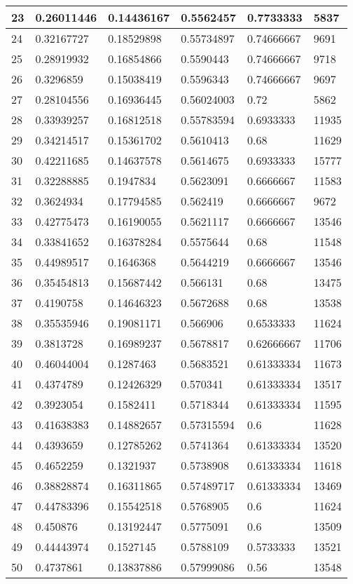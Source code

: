 \begin{longtable}{|l|l|l|l|l|l|}
23 & 0.26011446 & 0.14436167 & 0.5562457 & 0.7733333 & 5837 \\ \hline 
24 & 0.32167727 & 0.18529898 & 0.55734897 & 0.74666667 & 9691 \\ \hline 
25 & 0.28919932 & 0.16854866 & 0.5590443 & 0.74666667 & 9718 \\ \hline 
26 & 0.3296859 & 0.15038419 & 0.5596343 & 0.74666667 & 9697 \\ \hline 
27 & 0.28104556 & 0.16936445 & 0.56024003 & 0.72 & 5862 \\ \hline 
28 & 0.33939257 & 0.16812518 & 0.55783594 & 0.6933333 & 11935 \\ \hline 
29 & 0.34214517 & 0.15361702 & 0.5610413 & 0.68 & 11629 \\ \hline 
30 & 0.42211685 & 0.14637578 & 0.5614675 & 0.6933333 & 15777 \\ \hline 
31 & 0.32288885 & 0.1947834 & 0.5623091 & 0.6666667 & 11583 \\ \hline 
32 & 0.3624934 & 0.17794585 & 0.562419 & 0.6666667 & 9672 \\ \hline 
33 & 0.42775473 & 0.16190055 & 0.5621117 & 0.6666667 & 13546 \\ \hline 
34 & 0.33841652 & 0.16378284 & 0.5575644 & 0.68 & 11548 \\ \hline 
35 & 0.44989517 & 0.1646368 & 0.5644219 & 0.6666667 & 13546 \\ \hline 
36 & 0.35454813 & 0.15687442 & 0.566131 & 0.68 & 13475 \\ \hline 
37 & 0.4190758 & 0.14646323 & 0.5672688 & 0.68 & 13538 \\ \hline 
38 & 0.35535946 & 0.19081171 & 0.566906 & 0.6533333 & 11624 \\ \hline 
39 & 0.3813728 & 0.16989237 & 0.5678817 & 0.62666667 & 11706 \\ \hline 
40 & 0.46044004 & 0.1287463 & 0.5683521 & 0.61333334 & 11673 \\ \hline 
41 & 0.4374789 & 0.12426329 & 0.570341 & 0.61333334 & 13517 \\ \hline 
42 & 0.3923054 & 0.1582411 & 0.5718344 & 0.61333334 & 11595 \\ \hline 
43 & 0.41638383 & 0.14882657 & 0.57315594 & 0.6 & 11628 \\ \hline 
44 & 0.4393659 & 0.12785262 & 0.5741364 & 0.61333334 & 13520 \\ \hline 
45 & 0.4652259 & 0.1321937 & 0.5738908 & 0.61333334 & 11618 \\ \hline 
46 & 0.38828874 & 0.16311865 & 0.57489717 & 0.61333334 & 13469 \\ \hline 
47 & 0.44783396 & 0.15542518 & 0.5768905 & 0.6 & 11624 \\ \hline 
48 & 0.450876 & 0.13192447 & 0.5775091 & 0.6 & 13509 \\ \hline 
49 & 0.44443974 & 0.1527145 & 0.5788109 & 0.5733333 & 13521 \\ \hline 
50 & 0.4737861 & 0.13837886 & 0.57999086 & 0.56 & 13548 \\ \hline 
\end{longtable}